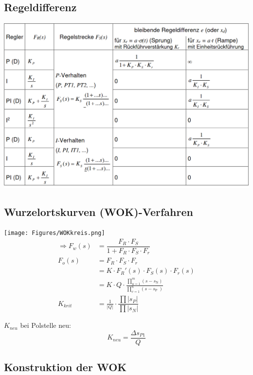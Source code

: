 

\subsection{Regeldifferenz}
\includegraphics[width=0.98\columnwidth]{Figures/Reglerauswahl.png}

\newpage
\subsection{Wurzelortskurven (WOK)-Verfahren}

\texttt{[image: Figures/WOKkreis.png]}
\begin{align*}
	\Rightarrow F_w (s) &= \dfrac {F_R \cdot F_S} {1+F_R \cdot F_S \cdot F_r} \\
				F_o(s) 	&= F_R \cdot F_S \cdot F_r \\
						& =K \cdot F_R '(s) \cdot F_S (s) \cdot F_r (s) \\
						& =K \cdot Q \cdot \frac{\prod_{u=1}^{m}\left(s-s_{\text {N}}\right)}{\prod_{v=1}^{n}\left(s-s_{\text {P }}\right)} \\
	K_{krit} 			&= \frac{1}{|Q|} \cdot \dfrac{\prod |s_{P}|}{\prod |s_{N}|}
\end{align*}

$K_{neu}$ bei Polstelle neu:
\[ K_{neu} = \frac{ \Delta s_{P1}}{Q} \]

\subsection{Konstruktion der WOK}

